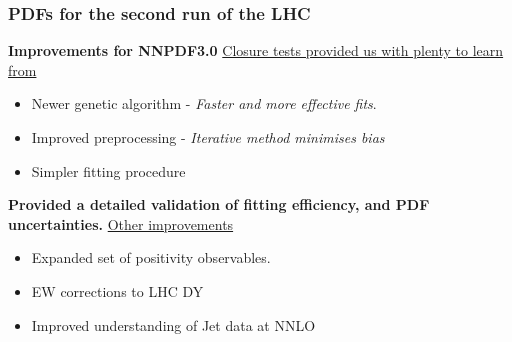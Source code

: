 \documentclass[10pt]{beamer}
\begin{document}
\begin{frame}
\frametitle{PDFs for the second run of the LHC}
\textbf{Improvements for NNPDF3.0}
\vskip10pt
\underline{Closure tests provided us with plenty to learn from}
\begin{itemize}
\item Newer genetic algorithm - \emph{Faster and more effective fits}.
\item Improved preprocessing - \emph{Iterative method minimises bias}
\item Simpler fitting procedure  
\end{itemize}
\vskip15pt
\textbf{Provided a detailed validation of fitting efficiency, and PDF uncertainties.}
\vskip15pt
\underline{Other improvements}
\begin{itemize}
\item Expanded set of positivity observables.
\item EW corrections to LHC DY
\item Improved understanding of Jet data at NNLO
\end{itemize}

\end{frame}
\end{document}
